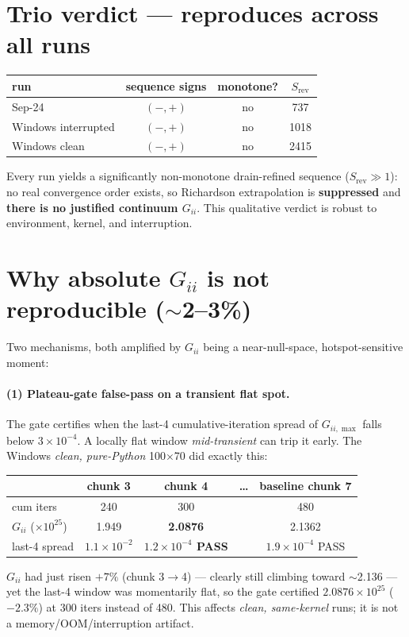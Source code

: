 \documentclass[11pt]{article}
\newcommand{\ten}[1]{\times 10^{#1}}
\begin{document}
\section*{Trio verdict --- reproduces across all runs}
\begin{center}
\begin{tabular}{l c c c}
\toprule
run & sequence signs & monotone? & $S_{\mathrm{rev}}$ \\
\midrule
Sep-24           & $(-,+)$ & no & 737 \\
Windows interrupted & $(-,+)$ & no & 1018 \\
Windows clean    & $(-,+)$ & no & 2415 \\
\bottomrule
\end{tabular}
\end{center}
\noindent Every run yields a significantly non-monotone drain-refined sequence ($S_{\mathrm{rev}}\gg1$): no real convergence order exists, so Richardson extrapolation is \textbf{suppressed} and \textbf{there is no justified continuum $G_{ii}$}. This qualitative verdict is robust to environment, kernel, and interruption.

\section*{Why absolute $G_{ii}$ is not reproducible ($\sim$2--3\%)}
Two mechanisms, both amplified by $G_{ii}$ being a near-null-space, hotspot-sensitive moment:

\paragraph{(1) Plateau-gate false-pass on a transient flat spot.} The gate certifies when the last-4 cumulative-iteration spread of $G_{ii,\max}$ falls below $3\ten{-4}$. A locally flat window \emph{mid-transient} can trip it early. The Windows \emph{clean, pure-Python} 100$\times$70 did exactly this:
\begin{center}
\begin{tabular}{l c c c c}
\toprule
 & chunk 3 & chunk 4 & \dots & baseline chunk 7 \\
\midrule
cum iters & 240 & 300 & & 480 \\
$G_{ii}$ ($\ten{25}$) & 1.949 & \textbf{2.0876} & & 2.1362 \\
last-4 spread & $1.1\ten{-2}$ & \textbf{$1.2\ten{-4}$ PASS} & & $1.9\ten{-4}$ PASS \\
\bottomrule
\end{tabular}
\end{center}
$G_{ii}$ had just risen $+7\%$ (chunk 3$\to$4) --- clearly still climbing toward $\sim$2.136 --- yet the last-4 window was momentarily flat, so the gate certified $2.0876\ten{25}$ ($-2.3\%$) at 300 iters instead of 480. This affects \emph{clean, same-kernel} runs; it is not a memory/OOM/interruption artifact.
\end{document}
